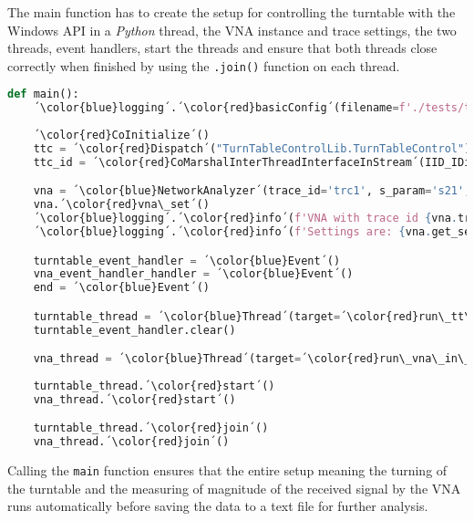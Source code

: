 The main function has to create the setup for controlling the turntable with the Windows API in a \textit{Python} thread, the VNA instance and trace settings, the two threads, event handlers, start the threads and ensure that both threads close correctly when finished by using the \verb+.join()+ function on each thread. 
\begin{lstlisting}[language=Python, caption=Main function.]
def main():
    ´\color{blue}logging´.´\color{red}basicConfig´(filename=f'./tests/test-{time.strftime("%Y%m%d-%H%M")}-log.txt', filemode='a', format="%(asctime)s:%(name)s: %(message)s", level=logging.INFO, datefmt="%Y-%m-%d %H:%M:%S")
    
    ´\color{red}CoInitialize´()
    ttc = ´\color{red}Dispatch´("TurnTableControlLib.TurnTableControl")
    ttc_id = ´\color{red}CoMarshalInterThreadInterfaceInStream´(IID_IDispatch, ttc)

    vna = ´\color{blue}NetworkAnalyzer´(trace_id='trc1', s_param='s21', freq=5.65)
    vna.´\color{red}vna\_set´()
    ´\color{blue}logging´.´\color{red}info´(f'VNA with trace id {vna.trace_id} is created. Measuring {vna.s_param}.')
    ´\color{blue}logging´.´\color{red}info´(f'Settings are: {vna.get_settings()}')

    turntable_event_handler = ´\color{blue}Event´()
    vna_event_handler_handler = ´\color{blue}Event´()
    end = ´\color{blue}Event´()

    turntable_thread = ´\color{blue}Thread´(target=´\color{red}run\_tt\_in\_thread´, kwargs={'ttc_id': ttc_id, 'ttc': ttc, 'turntable_event_handler': turntable_event_handler, 'vna_event_handler': vna_event_handler_handler, 'end': end})
    turntable_event_handler.clear()

    vna_thread = ´\color{blue}Thread´(target=´\color{red}run\_vna\_in\_thread´, kwargs={'vna': vna, 'turntable_event_handler': turntable_event_handler, 'vna_event_handler': vna_event_handler_handler, 'end': end})
    
    turntable_thread.´\color{red}start´()
    vna_thread.´\color{red}start´()

    turntable_thread.´\color{red}join´()
    vna_thread.´\color{red}join´()
\end{lstlisting}
Calling the \verb+main+ function ensures that the entire setup meaning the turning of the turntable and the measuring of magnitude of the received signal by the VNA runs automatically before saving the data to a text file for further analysis.